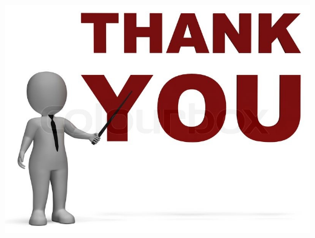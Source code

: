 \documentclass[11pt,center]{beamer}
\begin{document}
\nocite{*}
\begin{frame}
  \printbibliography
\end{frame}

\begin{frame}
  \centering
  \vspace{3em}
  \includegraphics[width=.55\textwidth]{../pics/thanks}
\end{frame}
\end{document}

